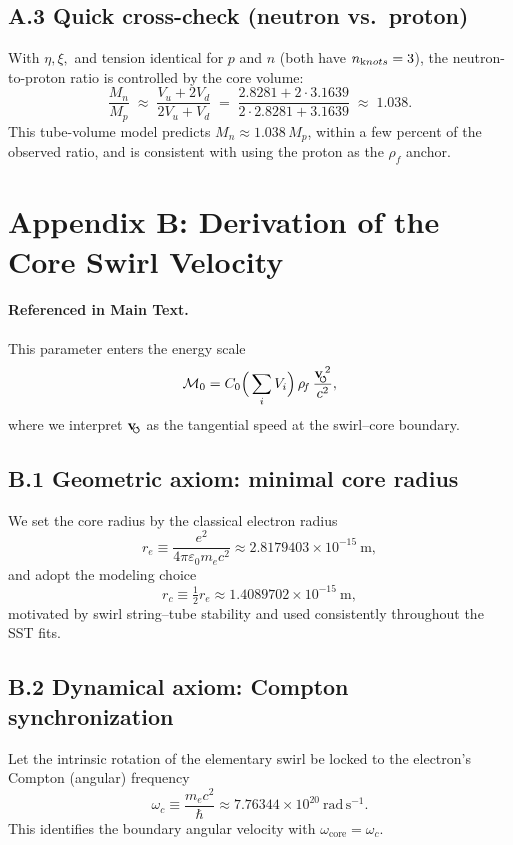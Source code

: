 \documentclass[11pt, preprint,titlepage]{revtex4-2}
\newcommand{\rhoF}{\rho_{\!f}}      %
\newcommand{\swirlarrow}{\!\!\scriptsize\boldsymbol{\circlearrowleft}}
\newcommand{\vswirl}{\mathbf{v}_{\swirlarrow}}
\begin{document}
	\subsection*{A.3 Quick cross-check (neutron vs.\ proton)}
	With \(\eta,\xi,\) and tension identical for \(p\) and \(n\) (both have \(n_{\textrm knots}=3\)),
	the neutron-to-proton ratio is controlled by the core volume:
	\[
		\frac{M_n}{M_p}\;\approx\;\frac{V_u + 2V_d}{2V_u + V_d}
		\;=\; \frac{2.8281 + 2\cdot 3.1639}{2\cdot 2.8281 + 3.1639}
		\;\approx\; 1.038.
	\]
	This tube-volume model predicts \(M_n \approx 1.038\,M_p\), within a few percent of the observed ratio, and is consistent with using the proton as the \(\rhoF\) anchor.

	\section*{Appendix B: Derivation of the Core Swirl Velocity}
	\label{sec:core_swirl_velocity}

	\paragraph{Referenced in Main Text.}
	This parameter enters the energy scale
	\[
		\mathcal{M}_0 = C_0 \Big(\sum_i V_i\Big)\,\rhoF\,\frac{\vswirl^{\,2}}{c^2},
	\]
	where we interpret \(\vswirl\) as the tangential speed at the swirl–core boundary.

	\subsection*{B.1 Geometric axiom: minimal core radius}
	We set the core radius by the classical electron radius
	\[
		r_e \equiv \frac{e^2}{4\pi \varepsilon_0 m_e c^2} \approx 2.8179403\times10^{-15}\ \mathrm{m},
	\]
	and adopt the modeling choice
	\[
		r_c \equiv \tfrac12 r_e \approx 1.4089702\times10^{-15}\ \mathrm{m},
	\]
	motivated by swirl string–tube stability and used consistently throughout the SST fits.

	\subsection*{B.2 Dynamical axiom: Compton synchronization}
	Let the intrinsic rotation of the elementary swirl be locked to the electron’s Compton (angular) frequency
	\[
		\omega_c \equiv \frac{m_e c^2}{\hbar} \approx 7.76344\times10^{20}\ \mathrm{rad\,s^{-1}} .
	\]
	This identifies the boundary angular velocity with \(\omega_{\text{core}}=\omega_c\).
\end{document}
